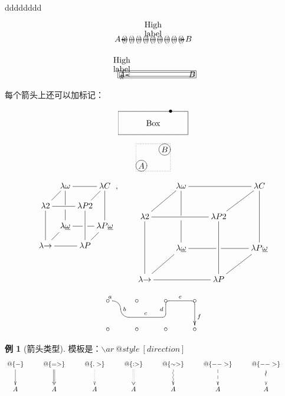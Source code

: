 \documentclass[openany]{ctexart}
\theoremstyle{definition}
\newtheorem{exam}{例}
\begin{document}
dddddddd
\begin{align*}
\xymatrix@1{
A \ar @{<*\composite{{+}*{()}}>} [rrr] ^*+\txt{High\\label} & & & B
}
\end{align*}

\begin{align*}
\xymatrix@1{
A \ar @{<*\frm{=}>} [rrr] ^*+\txt{High\\label} & & & B
}
\end{align*}

每个箭头上还可以加标记：

\begin{align*}
\xy *=<3cm,1cm>\txt{Box}*\frm{-}
!U!R(.5) *\frm{..}*{\bullet} \endxy
\end{align*}

\begin{align*}
\xy
(0,0) *++={A} *\frm{o} ;
(10,7) *++={B} *\frm{o} **\frm{.}
\endxy
\end{align*}

\begin{align*}
\xymatrix@!0{
& \lambda\omega \ar@{-}[rr]\ar@{-}'[d][dd]
& & \lambda C \ar@{-}[dd]
\\
\lambda2 \ar@{-}[ur]\ar@{-}[rr]\ar@{-}[dd]
& & \lambda P2 \ar@{-}[ur]\ar@{-}[dd]
\\
& \lambda\underline\omega \ar@{-}'[r][rr]
& & \lambda P\underline\omega
\\
\lambda{\to} \ar@{-}[rr]\ar@{-}[ur]
& & \lambda P \ar@{-}[ur]
}, \qquad \xymatrix{
& \lambda\omega \ar@{-}[rr]\ar@{-}'[d][dd]
& & \lambda C \ar@{-}[dd]
\\
\lambda2 \ar@{-}[ur]\ar@{-}[rr]\ar@{-}[dd]
& & \lambda P2 \ar@{-}[ur]\ar@{-}[dd]
\\
& \lambda\underline\omega \ar@{-}'[r][rr]
& & \lambda P\underline\omega
\\
\lambda{\to} \ar@{-}[rr]\ar@{-}[ur]
& & \lambda P \ar@{-}[ur]
}
\end{align*}

\begin{align*}
\xymatrix{
    {\circ} \ar `r[d]^a
    `[rr]^b
    `/4pt[rr]^c
    `[rrr]^d
    `[drrr]^e
    [drrr]^f
    & {\circ} & {\circ} & {\circ} \\
    {\circ} & {\circ} & {\circ} & {\circ} }
\end{align*}

\begin{exam}[箭头类型]
模板是：$\backslash ar ~ @style ~ [direction]$ 
\begin{align*}
\xymatrix{
    @\{ - \} \ar @{->} [d] &
    @\{ => \} \ar @{=>} [d] & 
    @\{ .> \} \ar @{.>} [d] &
    @\{ :> \} \ar @{:>} [d] &
    @\{ \sim > \}  \ar @{~>} [d] &
    @\{ --> \} \ar @{-->} [d] & 
    @\{ --> \} \ar @{~~>} [d] & \\
    A & A & A & A & A & A & A \\
} 
\end{align*}
\end{exam}
\end{document}
